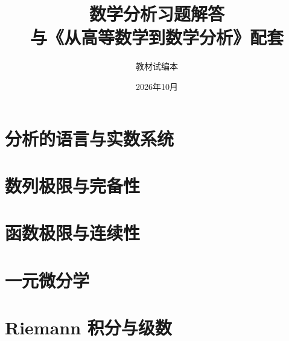 \documentclass[UTF8,zihao=-4,openany,fontset=fandol]{ctexbook}
\title{\Huge\bfseries 数学分析习题解答\\[0.8em]\Large 与《从高等数学到数学分析》配套}
\author{教材试编本}
\date{2026年10月}
\begin{document}
\frontmatter
\maketitle
\tableofcontents

\mainmatter
\setcounter{chapter}{-1}

\part{分析的语言与实数系统}





\part{数列极限与完备性}









\part{函数极限与连续性}





\part{一元微分学}






\part{Riemann 积分与级数}






\end{document}
